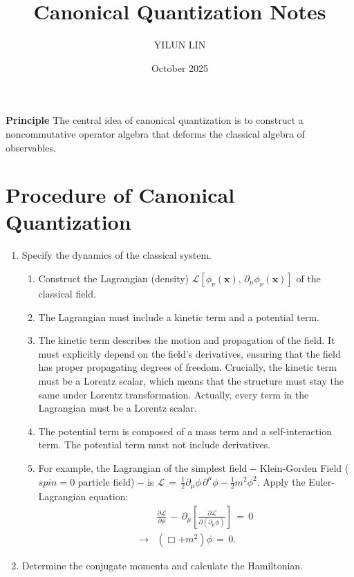 \documentclass[11pt]{article}
\title{Canonical Quantization Notes}
\author{YILUN LIN}
\date{October 2025}
\numberwithin{equation}{section}
\begin{document}
\maketitle
\Large\textbf{Principle}
\newline
\Large{The central idea of canonical quantization is to construct a noncommutative operator algebra that deforms the classical algebra of observables.}
\section{Procedure of Canonical Quantization}
\begin{enumerate}
    \item Specify the dynamics of the classical system.
    \begin{enumerate}
        \item Construct the Lagrangian (density) $\mathcal{L}\left[\phi_{\nu}\left(\mathbf{x}\right),\,\partial_{\mu}\phi_{\nu}\left(\mathbf{x}\right)\right]$ of the classical field.
        \item The Lagrangian must include a kinetic term and a potential term. 
        \item The kinetic term describes the motion and propagation of the field. It must explicitly depend on the field's derivatives, ensuring that the field has proper propagating degrees of freedom. Crucially, the kinetic term must be a Lorentz scalar, which means that the structure must stay the same under Lorentz transformation. Actually, every term in the Lagrangian must be a Lorentz scalar. 
        \item The potential term is composed of a mass term and a self-interaction term. The potential term must not include derivatives. 
        \item For example, the Lagrangian of the simplest field \--\-- Klein-Gorden Field ($spin=0$ particle field) \--\-- is $\mathcal{L}\,=\,\frac{1}{2}\partial_{\mu}\phi\,\partial^{\mu}\phi-\frac{1}{2}m^{2}\phi^{2}$.
        \newline Apply the Euler-Lagrangian equation:
        \begin{equation}
            \begin{split}
                &\frac{\partial\mathcal{L}}{\partial\phi}\,-\,\partial_{\mu}\left[\frac{\partial\mathcal{L}}{\partial\left(\partial_{\mu}\phi\right)}\right]\,=\,0 \\
                \longrightarrow&\left(\Box+m^{2}\right)\phi\,=\,0.
            \end{split}
        \end{equation}
    \end{enumerate}
    \item Determine the conjugate momenta and calculate the Hamiltonian.
\end{enumerate}
\end{document}
